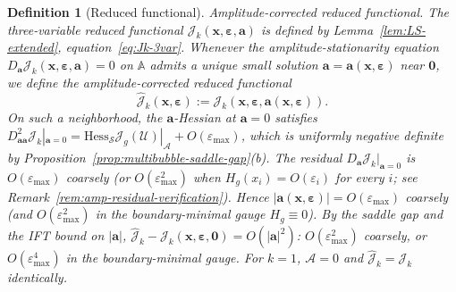 \documentclass[11pt,reqno,a4paper]{amsart}
\numberwithin{equation}{section}
\theoremstyle{plain}
\newtheorem{definition}[theorem]{Definition}
\theoremstyle{remark}
\theoremstyle{plain}
\begin{document}
\begin{definition}[Reduced functional]
\emph{Amplitude-corrected reduced functional.}
The three-variable reduced functional
$\mathcal J_k(\mathbf x,\boldsymbol\varepsilon,\mathbf a)$
is defined by Lemma~\ref{lem:LS-extended}, equation~\eqref{eq:Jk-3var}.
Whenever the amplitude-stationarity equation
$D_{\mathbf a}\mathcal J_k(\mathbf x,\boldsymbol\varepsilon,\mathbf a)=0$
on $\mathbb A$ admits a unique small solution $\mathbf a=\mathbf a(\mathbf x,\boldsymbol\varepsilon)$
near $\mathbf 0$, we define the \emph{amplitude-corrected reduced functional}
\[
\hat{\mathcal J}_k(\mathbf x,\boldsymbol\varepsilon)
:=\mathcal J_k(\mathbf x,\boldsymbol\varepsilon,\mathbf a(\mathbf x,\boldsymbol\varepsilon)).
\]
On such a neighborhood, the $\mathbf a$-Hessian at $\mathbf a=0$ satisfies
$D^2_{\mathbf a\mathbf a}\mathcal J_k|_{\mathbf a=0}
=\mathrm{Hess}_{\mathcal S}\mathcal J_g(\mathcal U)|_{\mathcal A}+O(\varepsilon_{\max})$,
which is uniformly negative definite by
Proposition~\ref{prop:multibubble-saddle-gap}\textup{(b)}.
The residual $D_{\mathbf a}\mathcal J_k|_{\mathbf a=0}$ is $O(\varepsilon_{\max})$ coarsely
(or $O(\varepsilon_{\max}^2)$ when $H_g(x_i)=O(\varepsilon_i)$ for every $i$; see
Remark~\ref{rem:amp-residual-verification}).
Hence $|\mathbf a(\mathbf x,\boldsymbol\varepsilon)|=O(\varepsilon_{\max})$ coarsely
(and $O(\varepsilon_{\max}^2)$ in the boundary-minimal gauge $H_g\equiv0$).
By the saddle gap and the IFT bound on $|\mathbf a|$,
$\hat{\mathcal J}_k-\mathcal J_k(\mathbf x,\boldsymbol\varepsilon,\mathbf 0)
=O(|\mathbf a|^2)$:
$O(\varepsilon_{\max}^2)$ coarsely, or $O(\varepsilon_{\max}^4)$ in the boundary-minimal gauge.
For $k=1$, $\mathcal A=0$ and $\hat{\mathcal J}_k=\mathcal J_k$ identically.
\end{definition}
\end{document}
